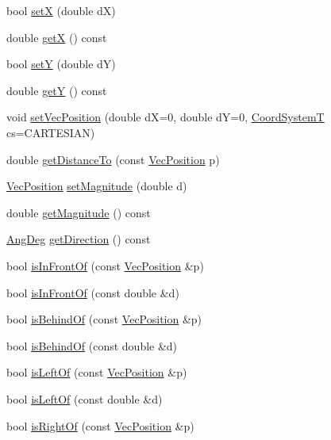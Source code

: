 \begin{DoxyCompactItemize}
bool \hyperlink{classVecPosition_a893fe5f3719c1331d17d55cec04b007e}{setX} (double dX)
\item 
double \hyperlink{classVecPosition_a54790e242837ab26bbf70299827f4f1a}{getX} () const 
\item 
bool \hyperlink{classVecPosition_a82ba61a96e9f325b3f69e4a89d5f0c33}{setY} (double dY)
\item 
double \hyperlink{classVecPosition_a067961cf425731e8c8c9f0c7909b3981}{getY} () const 
\item 
void \hyperlink{classVecPosition_a8740f7a3449e32cebf84dd061c603bd4}{set\+Vec\+Position} (double dX=0, double dY=0, \hyperlink{Geometry_8h_af3e194d00b468bcd9641c4d3576a0624}{Coord\+SystemT} cs=C\+A\+R\+T\+E\+S\+I\+AN)
\item 
double \hyperlink{classVecPosition_a2fe1f60cb35337a39c674e4acac1d084}{get\+Distance\+To} (const \hyperlink{classVecPosition}{Vec\+Position} p)
\item 
\hyperlink{classVecPosition}{Vec\+Position} \hyperlink{classVecPosition_a6dfb87d244283036c6d30e4ef2fd44c1}{set\+Magnitude} (double d)
\item 
double \hyperlink{classVecPosition_aaaac8963192c72e5833bdbf0ea4b124d}{get\+Magnitude} () const 
\item 
\hyperlink{Geometry_8h_a6bfe02ae9bb185092902092561ab2865}{Ang\+Deg} \hyperlink{classVecPosition_a34d1d255b20de06ac2042847b5a32b71}{get\+Direction} () const 
\item 
bool \hyperlink{classVecPosition_a2c53b5b17db4ba126307142d469e9529}{is\+In\+Front\+Of} (const \hyperlink{classVecPosition}{Vec\+Position} \&p)
\item 
bool \hyperlink{classVecPosition_a870cf166830e3decb11cb37f6e47b338}{is\+In\+Front\+Of} (const double \&d)
\item 
bool \hyperlink{classVecPosition_acd996c2bbd24a4df9c76e2d7b20b59f7}{is\+Behind\+Of} (const \hyperlink{classVecPosition}{Vec\+Position} \&p)
\item 
bool \hyperlink{classVecPosition_af179e6b0a8f9eee2190d2e390b265f0f}{is\+Behind\+Of} (const double \&d)
\item 
bool \hyperlink{classVecPosition_a68fe38da681e2f8443132a522b5c1c43}{is\+Left\+Of} (const \hyperlink{classVecPosition}{Vec\+Position} \&p)
\item 
bool \hyperlink{classVecPosition_af5610f18c9a5e4cd9c1fcdea8a76e5f0}{is\+Left\+Of} (const double \&d)
\item 
bool \hyperlink{classVecPosition_a6139b026ad41f9a8a32887cfe98d8f25}{is\+Right\+Of} (const \hyperlink{classVecPosition}{Vec\+Position} \&p)

\end{DoxyCompactItemize}
